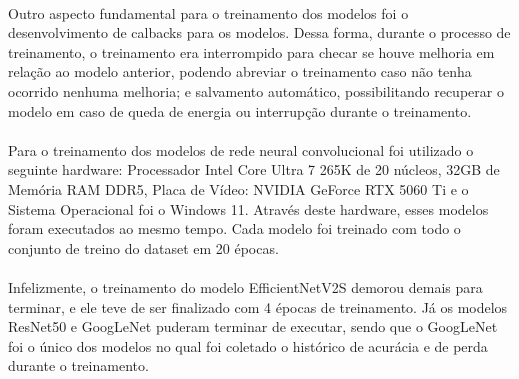 \documentclass[12pt]{article}
\begin{document}


\paragraph{}Outro aspecto fundamental para o treinamento dos modelos foi o desenvolvimento de calbacks para os modelos. Dessa forma, durante o processo de treinamento, o treinamento era interrompido para checar se houve melhoria em relação ao modelo anterior, podendo abreviar o treinamento caso não tenha ocorrido nenhuma melhoria; e salvamento automático, possibilitando recuperar o modelo em caso de queda de energia ou interrupção durante o treinamento.





\paragraph{}Para o treinamento dos modelos de rede neural convolucional foi utilizado o seguinte hardware: Processador Intel Core Ultra 7 265K de 20 núcleos, 32GB de Memória RAM DDR5, Placa de Vídeo: NVIDIA GeForce RTX 5060 Ti e o Sistema Operacional foi o Windows 11. Através deste hardware, esses modelos foram executados ao mesmo tempo. Cada modelo foi treinado com todo o conjunto de treino do dataset em 20 épocas.

\paragraph{}Infelizmente, o treinamento do modelo EfficientNetV2S demorou demais para terminar, e ele teve de ser finalizado com 4 épocas de treinamento. Já os modelos ResNet50 e GoogLeNet puderam terminar de executar, sendo que o GoogLeNet foi o único dos modelos no qual foi coletado o histórico de acurácia e de perda durante o treinamento.
\end{document}
